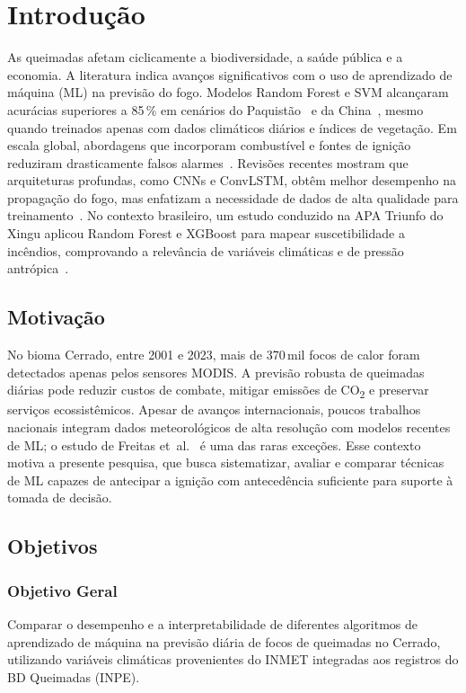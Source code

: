 
\chapter{Introdução}

As queimadas afetam ciclicamente a biodiversidade, a saúde pública e a economia. A literatura indica avanços significativos com o uso de aprendizado de máquina (ML) na previsão do fogo. Modelos Random Forest e SVM alcançaram acurácias superiores a 85\,\% em cenários do Paquistão~\cite{shahzad2024pakistan} e da China~\cite{pang2022china}, mesmo quando treinados apenas com dados climáticos diários e índices de vegetação. Em escala global, abordagens que incorporam combustível e fontes de ignição reduziram drasticamente falsos alarmes~\cite{giuseppe2025global}. Revisões recentes mostram que arquiteturas profundas, como CNNs e ConvLSTM, obtêm melhor desempenho na propagação do fogo, mas enfatizam a necessidade de dados de alta qualidade para treinamento~\cite{andrianarivony2024review}. No contexto brasileiro, um estudo conduzido na APA Triunfo do Xingu aplicou Random Forest e XGBoost para mapear suscetibilidade a incêndios, comprovando a relevância de variáveis climáticas e de pressão antrópica~\cite{freitas2025xingu}.

\section{Motivação}

No bioma Cerrado, entre 2001 e 2023, mais de 370\,mil focos de calor foram detectados apenas pelos sensores MODIS. A previsão robusta de queimadas diárias pode reduzir custos de combate, mitigar emissões de CO\textsubscript{2} e preservar serviços ecossistêmicos. Apesar de avanços internacionais, poucos trabalhos nacionais integram dados meteorológicos de alta resolução com modelos recentes de ML; o estudo de Freitas et~al.~\cite{freitas2025xingu} é uma das raras exceções. Esse contexto motiva a presente pesquisa, que busca sistematizar, avaliar e comparar técnicas de ML capazes de antecipar a ignição com antecedência suficiente para suporte à tomada de decisão.

\section{Objetivos}

\subsection{Objetivo Geral}
Comparar o desempenho e a interpretabilidade de diferentes algoritmos de aprendizado de máquina na previsão diária de focos de queimadas no Cerrado, utilizando variáveis climáticas provenientes do INMET integradas aos registros do BD Queimadas (INPE).

